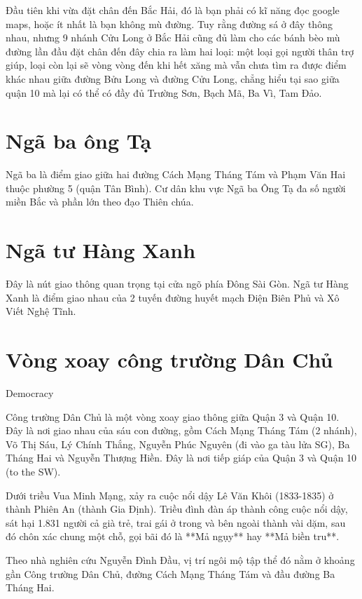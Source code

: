 Đầu tiên khi vừa đặt chân đến Bắc Hải, đó là bạn phải có kĩ năng đọc google maps, hoặc ít nhất là bạn không mù đường. Tuy rằng đường sá ở đây thông nhau, nhưng 9 nhánh Cửu Long ở Bắc Hải cũng đủ làm cho các bánh bèo mù đường lần đầu đặt chân đến đây chia ra làm hai loại: một loại gọi người thân trợ giúp, loại còn lại sẽ vòng vòng đến khi hết xăng mà vẫn chưa tìm ra được điểm khác nhau giữa đường Bửu Long và đường Cửu Long, chẳng hiểu tại sao giữa quận 10 mà lại có thể có đầy đủ Trường Sơn, Bạch Mã, Ba Vì, Tam Đảo.

\section{Ngã ba ông Tạ}

Ngã ba là điểm giao giữa hai đường Cách Mạng Tháng Tám và Phạm Văn Hai thuộc phường 5 (quận Tân Bình). Cư dân khu vực Ngã ba Ông Tạ đa số người miền Bắc và phần lớn theo đạo Thiên chúa.

\section{Ngã tư Hàng Xanh}

Đây là nút giao thông quan trọng tại cửa ngõ phía Đông Sài Gòn. Ngã tư Hàng Xanh là điểm giao nhau của 2 tuyến đường huyết mạch Điện Biên Phủ và Xô Viết Nghệ Tĩnh.

\section{Vòng xoay công trường Dân Chủ}

Democracy

 Công trường Dân Chủ là một vòng xoay giao thông giữa Quận 3 và Quận 10. Đây là nơi giao nhau của sáu con đường, gồm Cách Mạng Tháng Tám (2 nhánh), Võ Thị Sáu, Lý Chính Thắng, Nguyễn Phúc Nguyên (đi vào ga tàu lửa SG), Ba Tháng Hai và Nguyễn Thượng Hiền. Đây là nơi tiếp giáp của Quận 3 và Quận 10 (to the SW).

 Dưới triều Vua Minh Mạng, xảy ra cuộc nổi dậy Lê Văn Khôi (1833-1835) ở thành Phiên An (thành Gia Định). Triều đình đàn áp thành công cuộc nổi dậy, sát hại 1.831 người cả già trẻ, trai gái ở trong và bên ngoài thành vài dặm, sau đó chôn xác chung một chỗ, gọi bãi đó là **Mả ngụy** hay **Mả biền tru**.

Theo nhà nghiên cứu Nguyễn Đình Đầu, vị trí ngôi mộ tập thể đó nằm ở khoảng gần Công trường Dân Chủ, đường Cách Mạng Tháng Tám và đầu đường Ba Tháng Hai.

